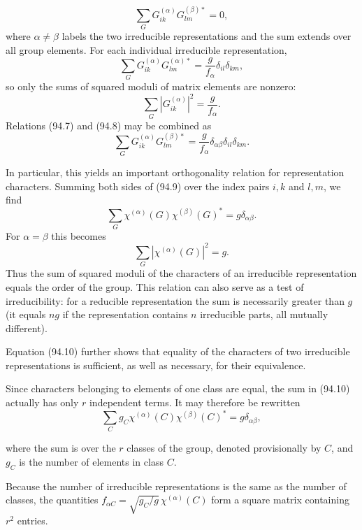 \begin{equation}
 \sum_GG_{ik}^{(\alpha)}G_{lm}^{(\beta)*}=0,
 \tag{94.7}
\end{equation}
where $\alpha\ne\beta$ labels the two irreducible representations and the sum extends over all group elements. For each individual irreducible representation,
\begin{equation}
 \sum_GG_{ik}^{(\alpha)}G_{lm}^{(\alpha)*}=\frac{g}{f_\alpha}\delta_{il}\delta_{km},
 \tag{94.8}
\end{equation}
so only the sums of squared moduli of matrix elements are nonzero:
\[
 \sum_G|G_{ik}^{(\alpha)}|^2=\frac{g}{f_\alpha}.
\]
Relations (94.7) and (94.8) may be combined as
\begin{equation}
 \sum_GG_{ik}^{(\alpha)}G_{lm}^{(\beta)*}=\frac{g}{f_\alpha}\delta_{\alpha\beta}\delta_{il}\delta_{km}.
 \tag{94.9}
\end{equation}

In particular, this yields an important orthogonality relation for representation characters. Summing both sides of (94.9) over the index pairs $i,k$ and $l,m$, we find
\begin{equation}
 \sum_G\chi^{(\alpha)}(G)\chi^{(\beta)}(G)^*=g\delta_{\alpha\beta}.
 \tag{94.10}
\end{equation}
For $\alpha=\beta$ this becomes
\[
 \sum_G|\chi^{(\alpha)}(G)|^2=g.
\]
Thus the sum of squared moduli of the characters of an irreducible representation equals the order of the group. This relation can also serve as a test of irreducibility: for a reducible representation the sum is necessarily greater than $g$ (it equals $ng$ if the representation contains $n$ irreducible parts, all mutually different).

Equation (94.10) further shows that equality of the characters of two irreducible representations is sufficient, as well as necessary, for their equivalence.

Since characters belonging to elements of one class are equal, the sum in (94.10) actually has only $r$ independent terms. It may therefore be rewritten
\begin{equation}
 \sum_Cg_C\chi^{(\alpha)}(C)\chi^{(\beta)}(C)^*=g\delta_{\alpha\beta},
 \tag{94.11}
\end{equation}

where the sum is over the $r$ classes of the group, denoted provisionally by $C$, and $g_C$ is the number of elements in class $C$.

Because the number of irreducible representations is the same as the number of classes, the quantities $f_{\alpha C}=\sqrt{g_C/g}\,\chi^{(\alpha)}(C)$ form a square matrix containing $r^2$ entries.

